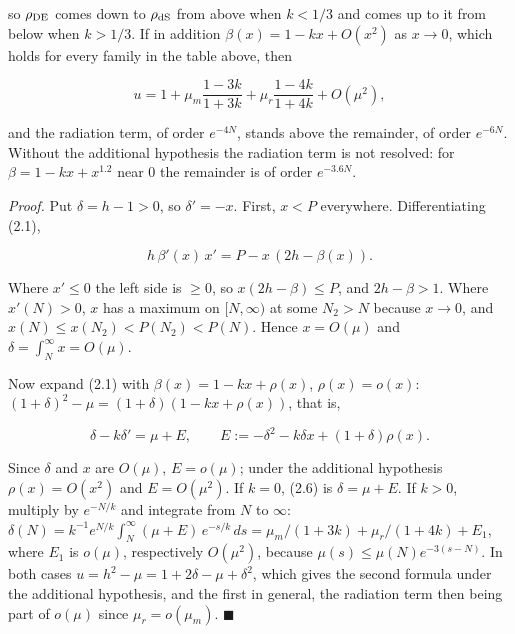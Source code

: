 \documentclass[11pt,a4paper]{article}
\begin{document}
so $\rho_{\rm DE}$ comes down to $\rho_{\rm dS}$ from above when $k < 1/3$ and comes up to it from below when $k > 1/3$.
If in addition $\beta(x) = 1 - kx + O(x^2)$ as $x \to 0$, which holds for every family in the table above, then


\begin{equation*}
u = 1 + \mu_m\frac{1 - 3k}{1 + 3k} + \mu_r\frac{1 - 4k}{1 + 4k} + O(\mu^2),
\end{equation*}


and the radiation term, of order $e^{-4N}$, stands above the remainder, of order $e^{-6N}$. Without the additional
hypothesis the radiation term is not resolved: for $\beta = 1 - kx + x^{1.2}$ near 0 the remainder is of order
$e^{-3.6N}$.

\emph{Proof.} Put $\delta = h - 1 > 0$, so $\delta' = -x$. First, $x < P$ everywhere. Differentiating (2.1),


\begin{equation*}
h\,\beta'(x)\,x' = P - x\,(2h - \beta(x)). \tag{2.5}
\end{equation*}


Where $x' \le 0$ the left side is $\ge 0$, so $x(2h - \beta) \le P$, and $2h - \beta > 1$. Where $x'(N) > 0$, $x$ has a
maximum on $[N, \infty)$ at some $N_2 > N$ because $x \to 0$, and $x(N) \le x(N_2) < P(N_2) < P(N)$. Hence
$x = O(\mu)$ and $\delta = \int_N^\infty x = O(\mu)$.

Now expand (2.1) with $\beta(x) = 1 - kx + \rho(x)$, $\rho(x) = o(x)$:
$(1 + \delta)^2 - \mu = (1 + \delta)(1 - kx + \rho(x))$, that is,


\begin{equation*}
\delta - k\delta' = \mu + E, \qquad E := -\delta^2 - k\delta x + (1 + \delta)\rho(x). \tag{2.6}
\end{equation*}


Since $\delta$ and $x$ are $O(\mu)$, $E = o(\mu)$; under the additional hypothesis $\rho(x) = O(x^2)$ and
$E = O(\mu^2)$. If $k = 0$, (2.6) is $\delta = \mu + E$. If $k > 0$, multiply by $e^{-N/k}$ and integrate from $N$ to
$\infty$: $\delta(N) = k^{-1}e^{N/k}\int_N^\infty (\mu + E)\,e^{-s/k}\,ds = \mu_m/(1 + 3k) + \mu_r/(1 + 4k) + E_1$, where
$E_1$ is $o(\mu)$, respectively $O(\mu^2)$, because $\mu(s) \le \mu(N)e^{-3(s - N)}$. In both cases
$u = h^2 - \mu = 1 + 2\delta - \mu + \delta^2$, which gives the second formula under the additional hypothesis, and
the first in general, the radiation term then being part of $o(\mu)$ since $\mu_r = o(\mu_m)$. \hfill$\blacksquare$
\end{document}
